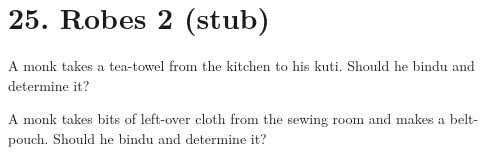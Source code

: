 \chapter{25. Robes 2 (stub)}
\renewcommand*{\theChapterTitle}{25. Robes 2}

A monk takes a tea-towel from the kitchen to his kuti. Should he bindu and
determine it?

A monk takes bits of left-over cloth from the sewing room and makes a
belt-pouch. Should he bindu and determine it?


